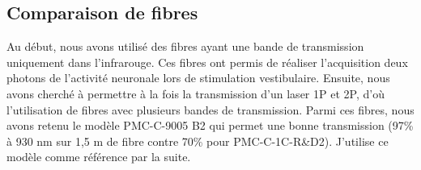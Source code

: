 
\subsection{Comparaison de fibres}



Au début, nous avons utilisé des fibres ayant une bande de transmission uniquement dans l'infrarouge. Ces fibres ont permis de réaliser l'acquisition deux photons de l'activité neuronale lors de stimulation vestibulaire. Ensuite, nous avons cherché à permettre à la fois la transmission d'un laser 1P et 2P, d'où l'utilisation de fibres avec plusieurs bandes de transmission. Parmi ces fibres, nous avons retenu le modèle PMC-C-9005 B2 qui permet une bonne transmission (97\% à 930 nm sur 1,5 m de fibre contre 70\% pour PMC-C-1C-R\&D2). J'utilise ce modèle comme référence par la suite.


